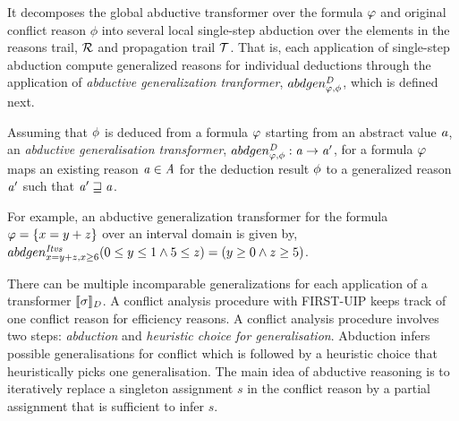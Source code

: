 It decomposes the global abductive transformer over the formula 
$\varphi$ and original conflict reason $\phi$ into several 
local single-step abduction over the elements in the reasons 
trail, $\mathcal{R}$ and propagation trail $\mathcal{T}$. That is, 
each application of single-step abduction compute generalized 
reasons for individual deductions through the 
application of \emph{abductive generalization tranformer}, 
$abdgen_{\varphi,\phi}^{\mathit{D}}$, which is defined next. 
%
\begin{definition}
Assuming that $\phi$ is deduced from a formula $\varphi$ starting from 
an abstract value $\mathit{a}$, an {\em abductive generalisation transformer}, 
  $abdgen_{\varphi,\phi}^{\mathit{D}}: \mathit{a} \rightarrow \mathit{a}'$, 
for a formula $\varphi$ maps an existing reason $\mathit{a} \in \mathit{A}$    
for the deduction result $\phi$ to a generalized reason $\mathit{a}'$ 
such that $\mathit{a}' \sqsupseteq \mathit{a}$. 
\end{definition}
%
\begin{exmp}
For example, an abductive generalization transformer for the formula 
$\varphi=\{x=y+z\}$ over an interval domain is given by, 
$abdgen_{x=y+z,x \geq 6}^{\mathit{Itvs}}(0 \leq y \leq 1 \wedge 5 \leq z)=(y \geq 0 
\wedge z \geq 5)$.
\end{exmp}
%
%
There can be multiple incomparable generalizations for each application 
of a transformer $\llbracket \sigma \rrbracket_{\mathit{D}}$. A conflict analysis 
procedure with FIRST-UIP keeps track of one conflict reason for efficiency 
reasons.  
%
A conflict analysis procedure involves two steps: {\em abduction} 
and {\em heuristic choice for generalisation}. Abduction infers 
possible generalisations for conflict which is followed by a heuristic choice
that heuristically picks one generalisation.  The main idea of abductive reasoning is to 
iteratively replace a singleton assignment $s$ in the conflict 
reason by a partial assignment that is sufficient to infer $s$.  

